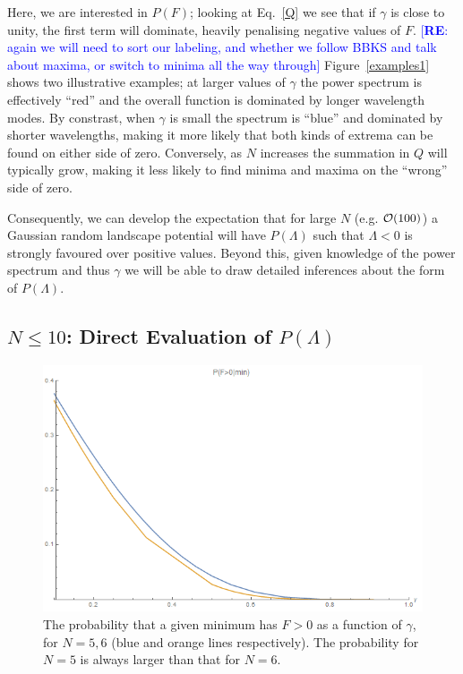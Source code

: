 \documentclass[12pt]{article}
\newcommand{\re}[1]{\textcolor{blue}{[{\bf RE}: #1]}}
\begin{document}
Here, we are interested in $P(F)$; looking at Eq.~\ref{Q} we see that if $\gamma$ is close to unity, the first term will dominate, heavily penalising negative values of $F$. \re{again we will need to sort our labeling, and whether we follow BBKS and talk about maxima, or switch to minima all the way through} Figure~\ref{examples1} shows two illustrative examples; at larger values of $\gamma$ the power spectrum is effectively ``red'' and the overall function is dominated by longer wavelength modes. By constrast, when $\gamma$ is small the spectrum is ``blue'' and dominated by shorter wavelengths, making it more likely that both kinds of extrema can be found on either side of zero.   Conversely, as $N$ increases the summation in $Q$ will typically grow, making it less likely to find minima and maxima on the ``wrong'' side of zero. 

Consequently, we can develop the expectation that for large $N$ (e.g. ${\cal{O}}(100)$) a Gaussian random landscape potential will have $P(\Lambda)$ such that $\Lambda< 0$ is strongly favoured over positive values. Beyond this, given knowledge of the power spectrum and thus $\gamma$ we will be able to draw detailed inferences about the form of $P(\Lambda)$. 





\subsection{$N\le10$: Direct Evaluation of $P(\Lambda)$  }

\begin{figure}
  \centering
  \includegraphics[width=\linewidth]{Analytic56.png}
  \caption{The probability that a given minimum has $F > 0$ as a function of $\gamma$, for $N=5,6$ (blue and orange lines respectively). The probability for $N=5$ is always larger than that for $N=6$.}
  \label{N6}
\end{figure}
\end{document}

